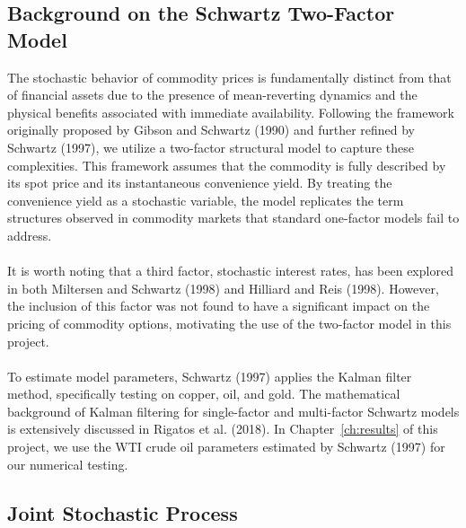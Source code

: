 \documentclass[12pt,a4paper]{article}
\begin{document}
\subsection{Background on the Schwartz Two-Factor Model}
The stochastic behavior of commodity prices is fundamentally distinct from that of financial assets due to the presence of mean-reverting dynamics and the physical benefits associated with immediate availability. Following the framework originally proposed by Gibson and Schwartz (1990) and further refined by Schwartz (1997), we utilize a two-factor structural model to capture these complexities. This framework assumes that the commodity is fully described by its spot price and its instantaneous convenience yield. By treating the convenience yield as a stochastic variable, the model replicates the term structures observed in commodity markets that standard one-factor models fail to address.\\\\
It is worth noting that a third factor, stochastic interest rates, has been explored in both Miltersen and Schwartz (1998) and Hilliard and Reis (1998). However, the inclusion of this factor was not found to have a significant impact on the pricing of commodity options, motivating the use of the two-factor model in this project.\\\\
To estimate model parameters, Schwartz (1997) applies the Kalman filter method, specifically testing on copper, oil, and gold. The mathematical background of Kalman filtering for single-factor and multi-factor Schwartz models is extensively discussed in Rigatos et al. (2018). In Chapter~\ref{ch:results} of this project, we use the WTI crude oil parameters estimated by Schwartz (1997) for our numerical testing.

\subsection{Joint Stochastic Process}\label{sec:joint}
\end{document}
